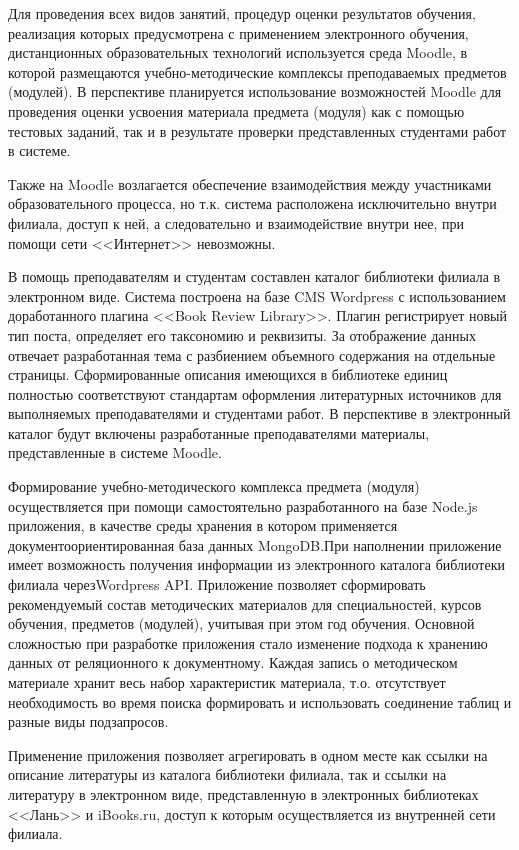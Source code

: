 \documentclass[10pt, a5paper]{article}
\begin{document}
Для проведения всех видов занятий, процедур оценки результатов обучения, реализация которых предусмотрена с применением электронного обучения, дистанционных образовательных технологий используется среда Moodle, в которой размещаются учебно-методические комплексы преподаваемых предметов (модулей). В перспективе планируется использование возможностей Moodle для проведения оценки усвоения материала предмета (модуля) как с помощью тестовых заданий, так и в результате проверки представленных студентами работ в системе.

Также на Moodle возлагается обеспечение взаимодействия между участниками образовательного процесса, но т.к. система расположена исключительно внутри филиала, доступ к ней, а следовательно и взаимодействие внутри нее, при помощи сети <<Интернет>> невозможны.

В помощь преподавателям и студентам составлен каталог библиотеки филиала в электронном виде. Система построена на базе CMS Wordpress с использованием доработанного плагина <<Book Review Library>>. Плагин регистрирует новый тип поста, определяет его таксономию и реквизиты. За отображение данных отвечает разработанная тема с разбиением объемного содержания на отдельные страницы. Сформированные описания имеющихся в библиотеке единиц полностью соответствуют стандартам оформления литературных источников для выполняемых преподавателями и студентами работ. В перспективе в электронный каталог будут включены разработанные преподавателями материалы, представленные в системе Moodle.

Формирование учебно-методического комплекса предмета (модуля) осуществляется при помощи самостоятельно разработанного на базе Node.js приложения, в качестве среды хранения в котором применяется документоориентированная база данных MongoDB.\linebreak При наполнении приложение имеет возможность получения информации из электронного каталога библиотеки филиала через\linebreak Wordpress API. Приложение позволяет сформировать рекомендуемый состав методических материалов для специальностей, курсов обучения, предметов (модулей), учитывая при этом год обучения. Основной сложностью при разработке приложения стало изменение подхода к хранению данных от реляционного к документному. Каждая запись о методическом материале хранит весь набор характеристик материала, т.о. отсутствует необходимость во время поиска формировать и использовать соединение таблиц и разные виды подзапросов.

Применение приложения позволяет агрегировать в одном месте как ссылки на описание литературы из каталога библиотеки филиала, так и ссылки на литературу в электронном виде, представленную в электронных библиотеках <<Лань>> и iBooks.ru, доступ к которым осуществляется из внутренней сети филиала.
\end{document}
